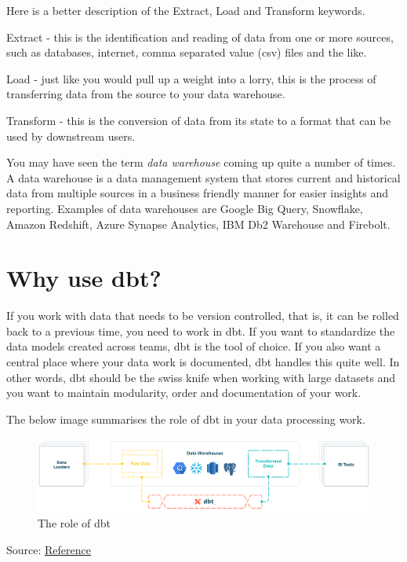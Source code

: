 \documentclass[
]{book}
\begin{document}
Here is a better description of the Extract, Load and Transform keywords.

Extract - this is the identification and reading of data from one or more sources, such as databases, internet, comma separated value (csv) files and the like.

Load - just like you would pull up a weight into a lorry, this is the process of transferring data from the source to your data warehouse.

Transform - this is the conversion of data from its state to a format that can be used by downstream users.

You may have seen the term \emph{data warehouse} coming up quite a number of times. A data warehouse is a data management system that stores current and historical data from multiple sources in a business friendly manner for easier insights and reporting. Examples of data warehouses are Google Big Query, Snowflake, Amazon Redshift, Azure Synapse Analytics, IBM Db2 Warehouse and Firebolt.

\hypertarget{why-use-dbt}{%
\section{Why use dbt?}\label{why-use-dbt}}

If you work with data that needs to be version controlled, that is, it can be rolled back to a previous time, you need to work in dbt. If you want to standardize the data models created across teams, dbt is the tool of choice. If you also want a central place where your data work is documented, dbt handles this quite well. In other words, dbt should be the swiss knife when working with large datasets and you want to maintain modularity, order and documentation of your work.

The below image summarises the role of dbt in your data processing work.

\begin{figure}
\centering
\includegraphics{./images/dbt.png}
\caption{The role of dbt}
\end{figure}

Source: \href{https://www.startdataengineering.com/post/advantages-of-using-dbt-data-build-tool/}{Reference}
\end{document}
